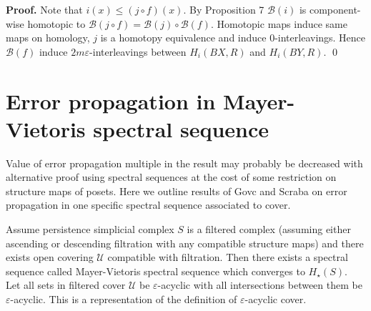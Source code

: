 \documentclass[a4paper, 12pt]{article}
\newtheorem{proposition}{Proposition}
\theoremstyle{definition}
\theoremstyle{remark}
\newenvironment{pf}{\noindent\textbf{Proof.}}{\qed}
\begin{document}
\begin{pf}
  Note that $i(x) \leqslant (j \circ f)(x)$. By Proposition 7 $\mathcal{B}(i)$ is component-wise homotopic to $\mathcal{B}(j \circ f) = \mathcal{B}(j) \circ \mathcal{B}(f)$. Homotopic maps induce same maps on homology, $j$ is a homotopy equivalence and induce $0$-interleavings. Hence $\mathcal{B}(f)$ induce $2m\varepsilon$-interleavings between $H_i(BX,R)$ and $H_i(BY,R)$.
\end{pf}

%
%
%

\section{Error propagation in Mayer-Vietoris spectral sequence}

Value of error propagation multiple in the result may probably be decreased with alternative proof using spectral sequences at the cost of some restriction on structure maps of posets. Here we outline results of Govc and Scraba on error propagation in one specific spectral sequence associated to cover.

Assume persistence simplicial complex $S$ is a filtered complex (assuming either ascending or descending filtration with any compatible structure maps) and there exists open covering $\mathcal{U}$ compatible with filtration. Then there exists a spectral sequence called Mayer-Vietoris spectral sequence which converges to $H_{\star}(S)$. {\cite[Theorem 2.30]{GS16}}\\

Let all sets in filtered cover $\mathcal{U}$ be $\varepsilon$-acyclic with all intersections between them be $\varepsilon$-acyclic. This is a representation of the definition of $\varepsilon$-acyclic cover. {\cite[Definition 3.2]{GS16}}\\
\end{document}
